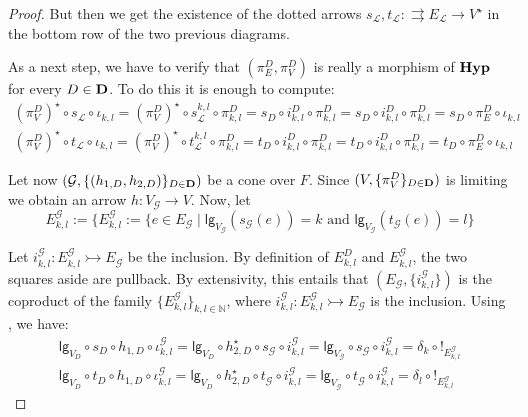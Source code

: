 \documentclass[3p]{elsarticle}
\newcommand{\lgh}{\mathsf{lg}}
\def\D{\textbf {\textup{D}}}
\newcommand{\catname}[1]{\textbf{\textup{#1}}}
\newcommand{\hyp}{\catname{Hyp}}
\newcommand{\mto}{\rightarrowtail}
\theoremstyle{remark}
\theoremstyle{definition}
\begin{document}
\begin{proof}
	But then we get the existence of the dotted arrows $s_{\mathcal{L}}, t_{\mathcal{L}}\colon \rightrightarrows E_{\mathcal{L}}\to V^\star$ in the bottom row of the two previous diagrams.
	
	As a next step,  we have to verify that $(\pi^D_E, \pi^D_V)$ is really a morphism of $\hyp$ for every $D\in \D$. To do this it is enough to compute:
\begin{gather*}
	(\pi^D_V)^\star \circ s_{\mathcal{L}}\circ \iota_{k,l} = (\pi^D_V)^\star\circ s^{k,l}_{\mathcal{L}} \circ \pi^D_{k,l}=s_D\circ i^D_{k,l}\circ \pi^D_{k,l} = s_D\circ i^D_{k,l}\circ \pi^D_{k,l}
	=s_D\circ \pi^D_E \circ \iota_{k,l} \\
		(\pi^D_V)^\star\circ t_{\mathcal{L}}\circ \iota_{k,l} = (\pi^D_V)^\star\circ t^{k,l}_{\mathcal{L}} \circ \pi^D_{k,l}=t_D\circ i^D_{k,l}\circ \pi^D_{k,l} = t_D\circ i^D_{k,l}\circ \pi^D_{k,l}
	=t_D\circ \pi^D_E \circ \iota_{k,l} 
\end{gather*}	

Let now $(\mathcal{G}, \{(h_{1,D}, h_{2,D})\}_{D\in \D})$ be a cone over $F$. Since $(V, \{\pi^D_V\}_{D\in \D})$ is limiting we obtain an arrow $h\colon V_{\mathcal{G}}\to V$.  Now, let 
\[E_{k,l}^{\mathcal{G}}:=\{	E^{\mathcal{G}}_{k,l}:=\{e\in E_{\mathcal{G}} \mid \lgh_{V_{\mathcal{G}}}(s_{{\mathcal{G}}}(e)) = k \text{ and } \lgh_{V_{\mathcal{G}}}(t_{{\mathcal{G}}}(e)) = l \}\]

\noindent 
\begin{minipage}[l]{.72\linewidth}
			\setlength{\parindent}{1.5em}
			
Let $i^{\mathcal{G}}_{k,l}\colon E^{\mathcal{G}}_{k,l} \mto E_{\mathcal{G}} $ be the inclusion. By definition of $E^{D}_{k,l}$ and $E^{\mathcal{G}}_{k,l}$, the two squares aside are pullback.  By extensivity, this entails that $(E_{\mathcal{G}}, \{i^\mathcal{G}_{k,l}\})$ is the coproduct of the family $\{E_{k,l}^{\mathcal{G}}\}_{k,l \in \mathbb{N}}$, where $i^\mathcal{G}_{k,l}\colon E_{k,l}^{\mathcal{G}}\mto E_{\mathcal{G}}$ is the inclusion. Using , we have:
\begin{gather*}\lgh_{V_D} \circ s_{D}\circ h_{1,D}\circ \iota^{\mathcal{G}}_{k,l}=\lgh_{V_D}\circ h^\star_{2,D}\circ s_{\mathcal{G}}\circ i^{\mathcal{G}}_{k,l}=\lgh_{V_{\mathcal{G}}}\circ s_{\mathcal{G}}\circ i^{\mathcal{G}}_{k,l} = \delta_{k} \circ !_{E^{\mathcal{G}}_{k,l}}\\
	\lgh_{V_D} \circ t_{D}\circ h_{1,D}\circ \iota^{\mathcal{G}}_{k,l}=\lgh_{V_D}\circ h^\star_{2,D}\circ t_{\mathcal{G}}\circ i^{\mathcal{G}}_{k,l}=\lgh_{V_{\mathcal{G}}}\circ t_{\mathcal{G}}\circ i^{\mathcal{G}}_{k,l} = \delta_{l} \circ !_{E^{\mathcal{G}}_{k,l}}
\end{gather*}


\end{minipage}
\end{proof}
\end{document}
